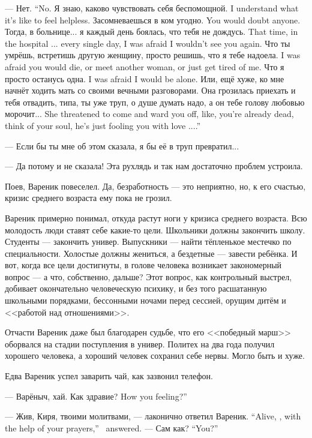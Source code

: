 {--- Нет.}
{``No.}
{Я знаю, каково чувствовать себя беспомощной.}
{I understand what it's like to feel helpless.}
{Засомневаешься в ком угодно.}
{You would doubt anyone.}
{Тогда, в больнице... я каждый день боялась, что тебя не дождусь.}
{That time, in the hospital ... every single day, I was afraid I wouldn't see you again.}
{Что ты умрёшь, встретишь другую женщину, просто решишь, что я тебе надоела.}
{I was afraid you would die, or meet another woman, or just get tired of me.}
{Что я просто останусь одна.}
{I was afraid I would be alone.}
Или, ещё хуже, ко мне начнёт ходить мать со своими вечными разговорами.
{Она грозилась приехать и тебя отвадить, типа, ты уже труп, о душе думать надо, а он тебе голову любовью морочит...}
{She threatened to come and ward you off, like, you're already dead, think of your soul, he's just fooling you with love ....''}

--- Если бы ты мне об этом сказала, я бы её в труп превратил...

--- Да потому и не сказала!
Эта рухлядь и так нам достаточно проблем устроила.

Поев, Вареник повеселел.
Да, безработность --- это неприятно, но, к его счастью, кризис среднего возраста ему пока не грозил.

Вареник примерно понимал, откуда растут ноги у кризиса среднего возраста.
Всю молодость люди ставят себе какие-то цели.
Школьники должны закончить школу.
Студенты --- закончить универ.
Выпускники --- найти тёпленькое местечко по специальности.
Холостые должны жениться, а бездетные --- завести ребёнка.
И вот, когда все цели достигнуты, в голове человека возникает закономерный вопрос --- а что, собственно, дальше?
Этот вопрос, как контрольный выстрел, добивает окончательно человеческую психику, и без того расшатанную школьными порядками, бессонными ночами перед сессией, орущим дитём и <<работой над отношениями>>.

Отчасти Вареник даже был благодарен судьбе, что его <<победный марш>> оборвался на стадии поступления в универ.
Политех на два года получил хорошего человека, а хороший человек сохранил себе нервы.
Могло быть и хуже.

\asterism

Едва Вареник успел заварить чай, как зазвонил телефон.

--- Варёныч, хай.
{Как здравие?}
{How you feeling?''}

{--- Жив, Киря, твоими молитвами, --- лаконично ответил Вареник.}
{``Alive, \Kirya, with the help of your prayers,'' \Varenik\ answered.}
{--- Сам как?}
{``You?''}

